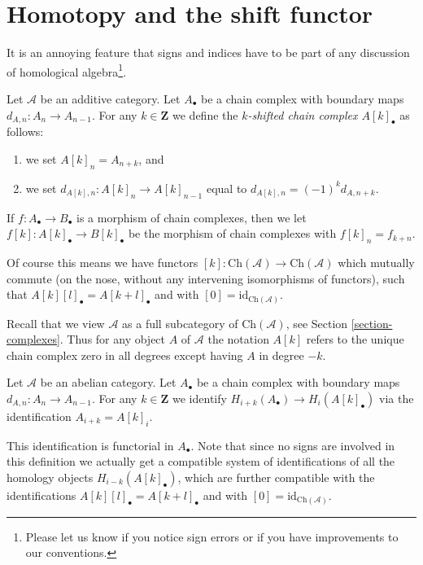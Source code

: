 \section{Homotopy and the shift functor}
\label{section-homotopy-shift}

\noindent
It is an annoying feature that signs and indices
have to be part of any discussion of homological
algebra\footnote{Please let us know if you notice sign errors or
if you have improvements to our conventions.}.

\begin{definition}
\label{definition-shift}
Let $\mathcal{A}$ be an additive category.
Let $A_\bullet$ be a chain complex
with boundary maps $d_{A, n} : A_n \to A_{n - 1}$.
For any $k \in \mathbf{Z}$ we define the
{\it $k$-shifted chain complex $A[k]_\bullet$}
as follows:
\begin{enumerate}
\item we set $A[k]_n = A_{n + k}$, and
\item we set $d_{A[k], n} : A[k]_n \to A[k]_{n - 1}$
equal to $d_{A[k], n} = (-1)^k d_{A, n + k}$.
\end{enumerate}
If $f : A_\bullet \to B_\bullet$ is a morphism of
chain complexes, then we let
$f[k] : A[k]_\bullet \to B[k]_\bullet$ be the
morphism of chain complexes with
$f[k]_n = f_{k + n}$.
\end{definition}

\noindent
Of course this means we have functors
$[k] : \text{Ch}(\mathcal{A}) \to \text{Ch}(\mathcal{A})$
which mutually commute (on the nose, without
any intervening isomorphisms of functors),
such that $A[k][l]_\bullet = A[k + l]_\bullet$ and
with $[0] = \text{id}_{\text{Ch}(\mathcal{A})}$.

\medskip\noindent
Recall that we view $\mathcal{A}$ as a full subcategory of
$\text{Ch}(\mathcal{A})$, see Section \ref{section-complexes}.
Thus for any object $A$ of $\mathcal{A}$ the notation $A[k]$
refers to the unique chain complex zero in all degrees except having
$A$ in degree $-k$.

\begin{definition}
\label{definition-homology-shift}
Let $\mathcal{A}$ be an abelian category.
Let $A_\bullet$ be a chain complex
with boundary maps $d_{A, n} : A_n \to A_{n - 1}$.
For any $k \in \mathbf{Z}$ we identify
{\it $H_{i + k}(A_\bullet) \rightarrow H_i(A[k]_\bullet)$}
via the identification
$A_{i + k} = A[k]_i$.
\end{definition}

\noindent
This identification is functorial in $A_\bullet$.
Note that since no signs are involved in this
definition we actually get a compatible system
of identifications of all the homology
objects $H_{i - k}(A[k]_\bullet)$, which are
further compatible with the identifications
$A[k][l]_\bullet = A[k + l]_\bullet$ and
with $[0] = \text{id}_{\text{Ch}(\mathcal{A})}$.

